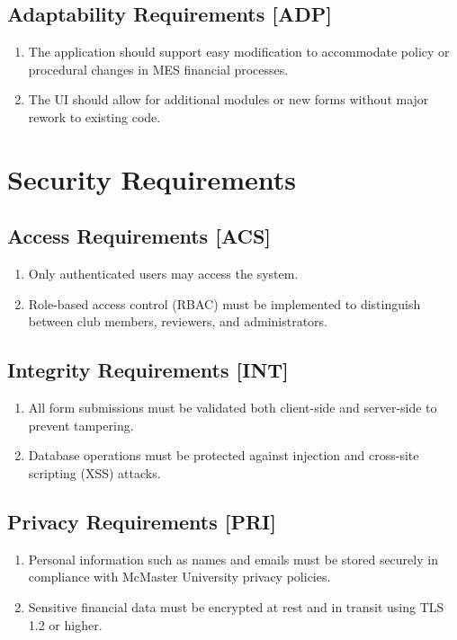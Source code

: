 \documentclass[12pt]{article}
\begin{document}
\begin{enumerate}
\subsection{Adaptability Requirements [ADP]}
\begin{enumerate}
    \item The application should support easy modification to accommodate policy or procedural changes in MES financial processes.
    \item The UI should allow for additional modules or new forms without major rework to existing code.
\end{enumerate}

\section{Security Requirements}

\subsection{Access Requirements [ACS]}
\begin{enumerate}
    \item Only authenticated users may access the system.
    \item Role-based access control (RBAC) must be implemented to distinguish between club members, reviewers, and administrators.
\end{enumerate}

\subsection{Integrity Requirements [INT]}
\begin{enumerate}
    \item All form submissions must be validated both client-side and server-side to prevent tampering.
    \item Database operations must be protected against injection and cross-site scripting (XSS) attacks.
\end{enumerate}

\subsection{Privacy Requirements [PRI]}
\begin{enumerate}
    \item Personal information such as names and emails must be stored securely in compliance with McMaster University privacy policies.
    \item Sensitive financial data must be encrypted at rest and in transit using TLS 1.2 or higher.
\end{enumerate}


\end{enumerate}
\end{document}
